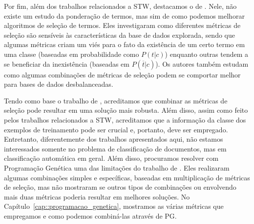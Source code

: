 Por fim, além dos trabalhos relacionados a \textsc{STW}, destacamos o de \cite{Tang05}.
Nele, não existe um estudo da ponderação de termos, mas sim de como podemos melhorar algoritmos de seleção de termos.
Eles investigaram como diferentes métricas de seleção são sensíveis às características da base de dados explorada, sendo que algumas métricas criam um viés para o fato da existência de um certo termo em uma classe (baseadas em probabilidade como $P(t|c)$) enquanto outras tendem a se beneficiar da inexistência (baseadas em $P(\overline{t}|c)$). Os autores também estudam como algumas combinações de métricas de seleção podem se comportar melhor para bases de dados desbalanceadas.

Tendo como base o trabalho de \cite{Tang05}, acreditamos que combinar as métricas de seleção pode resultar em uma solução mais robusta. Além disso, assim como feito pelos trabalhos relacionados a \textsc{STW}, acreditamos que a informação da classe dos exemplos de treinamento pode ser crucial e, portanto, deve ser empregado.
Entretanto, diferentemente dos trabalhos apresentados aqui, não estamos interessados somente no problema de classificação de documentos, mas em classificação automática em geral.
Além disso, procuramos resolver com Programação Genética uma das limitações do trabalho de \cite{Tang05}. Eles realizaram algumas combinações simples e específicas, baseadas em multiplicação de métricas de seleção, mas não mostraram se outros tipos de combinações ou envolvendo mais duas métricas poderia resultar em melhores soluções. No Capítulo~\ref{cap::programacao_genetica}, mostramos as várias métricas que empregamos e como podemos combiná-las através de \textsc{PG}.


